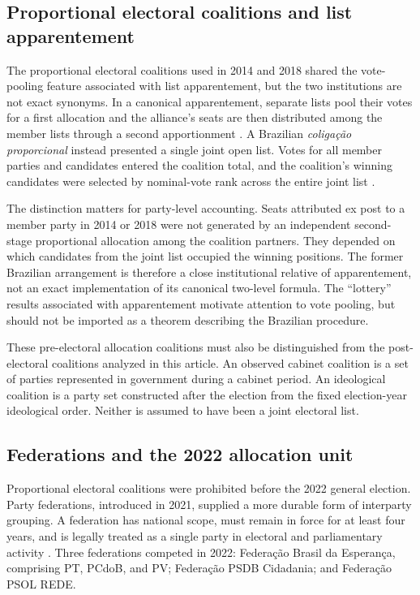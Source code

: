 \documentclass[11pt]{article}
\begin{document}
\subsection{Proportional electoral coalitions and list apparentement}

The proportional electoral coalitions used in 2014 and 2018 shared the
vote-pooling feature associated with list apparentement, but the two
institutions are not exact synonyms. In a canonical apparentement, separate
lists pool their votes for a first allocation and the alliance's seats are then
distributed among the member lists through a second apportionment
\parencite{pukelsheimLeutgaeb2013apparentements}. A Brazilian
\emph{coligação proporcional} instead presented a single joint open list.
Votes for all member parties and candidates entered the coalition total, and
the coalition's winning candidates were selected by nominal-vote rank across
the entire joint list \parencite{nicolau2006openlist}.

The distinction matters for party-level accounting. Seats attributed ex post
to a member party in 2014 or 2018 were not generated by an independent
second-stage proportional allocation among the coalition partners. They
depended on which candidates from the joint list occupied the winning
positions. The former Brazilian arrangement is therefore a close
institutional relative of apparentement, not an exact implementation of its
canonical two-level formula. The ``lottery'' results associated with
apparentement motivate attention to vote pooling, but should not be imported
as a theorem describing the Brazilian procedure.

These pre-electoral allocation coalitions must also be distinguished from
the post-electoral coalitions analyzed in this article. An observed cabinet
coalition is a set of parties represented in government during a cabinet
period. An ideological coalition is a party set constructed after the election
from the fixed election-year ideological order. Neither is assumed to have
been a joint electoral list.

\subsection{Federations and the 2022 allocation unit}

Proportional electoral coalitions were prohibited before the 2022 general
election. Party federations, introduced in 2021, supplied a more durable
form of interparty grouping. A federation has national scope, must remain
in force for at least four years, and is legally treated as a single party in
electoral and parliamentary activity
\parencite{tse2022federacoes}. Three federations competed in 2022:
Federação Brasil da Esperança, comprising PT, PCdoB, and PV; Federação
PSDB Cidadania; and Federação PSOL REDE.
\end{document}
